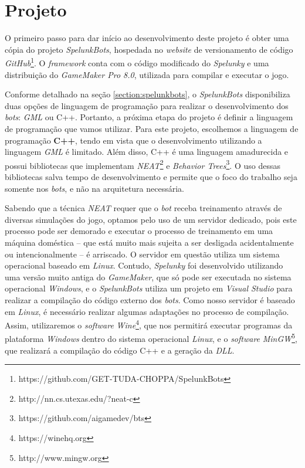 \chapter{\label{chap:project}Projeto}
O primeiro passo para dar início ao desenvolvimento deste projeto é obter uma
cópia do projeto \textit{SpelunkBots}, hospedada no \textit{website} de
versionamento de código
\textit{GitHub}\footnote{https://github.com/GET-TUDA-CHOPPA/SpelunkBots}. O
\textit{framework} conta com o código modificado do \textit{Spelunky} e uma
distribuição do \textit{GameMaker Pro 8.0}, utilizada para compilar e executar o
jogo.

Conforme detalhado na seção \ref{section:spelunkbots}, o \textit{SpelunkBots}
disponibiliza duas opções de linguagem de programação para realizar o
desenvolvimento dos \textit{bots}: \textit{GML} ou C++. Portanto, a próxima
etapa do projeto é definir a linguagem de programação que vamos utilizar. Para
este projeto, escolhemos a linguagem de programação \textbf{C++}, tendo em vista
que o desenvolvimento utilizando a linguagem \textit{GML} é limitado. Além
disso, C++ é uma linguagem amadurecida e possui bibliotecas que implementam
\textit{NEAT}\footnote{http://nn.cs.utexas.edu/?neat-c} e \textit{Behavior
Trees}\footnote{https://github.com/aigamedev/bts}. O uso dessas bibliotecas
salva tempo de desenvolvimento e permite que o foco do trabalho seja somente nos
\textit{bots}, e não na arquitetura necessária.

Sabendo que a técnica \textit{NEAT} requer que o \textit{bot} receba treinamento
através de diversas simulações do jogo, optamos pelo uso de um servidor
dedicado, pois este processo pode ser demorado e executar o processo de
treinamento em uma máquina doméstica -- que está muito mais sujeita a ser
desligada acidentalmente ou intencionalmente -- é arriscado. O servidor em
questão utiliza um sistema operacional baseado em \textit{Linux}.  Contudo,
\textit{Spelunky} foi desenvolvido utilizando uma versão muito antiga do
\textit{GameMaker}, que só pode ser executada no sistema operacional
\textit{Windows}, e o \textit{SpelunkBots} utiliza um projeto em \textit{Visual
Studio} para realizar a compilação do código externo dos \textit{bots}. Como
nosso servidor é baseado em \textit{Linux}, é necessário realizar algumas
adaptações no processo de compilação. Assim, utilizaremos o \textit{software}
\textit{Wine}\footnote{https://winehq.org}, que nos permitirá executar programas
da plataforma \textit{Windows} dentro do sistema operacional \textit{Linux}, e o
\textit{software} \textit{MinGW}\footnote{http://www.mingw.org}, que realizará a
compilação do código C++ e a geração da \textit{DLL}.

